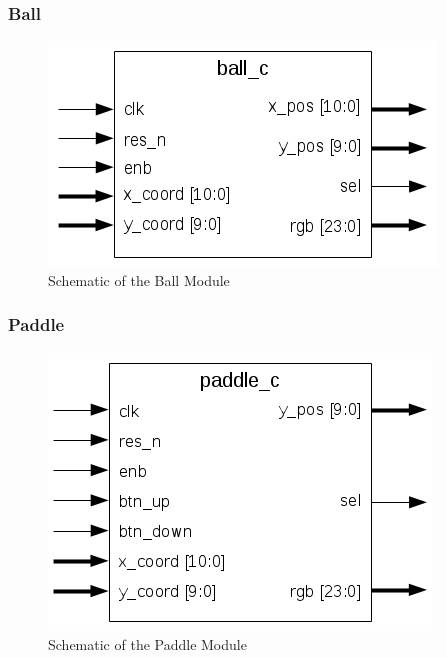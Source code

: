         \subsubsection{Ball}
	        \begin{figure}[here]
		        \centering
		        \includegraphics[scale=0.7]{images/ball_schematic.png}
		        \caption{Schematic of the Ball Module}
		        \label{ball_sch}
	        \end{figure}
        \subsubsection{Paddle}
	        \begin{figure}[here]
		        \centering
		        \includegraphics[scale=0.7]{images/paddle_schematic.png}
		        \caption{Schematic of the Paddle Module}
		        \label{paddle_sch}
	        \end{figure}
